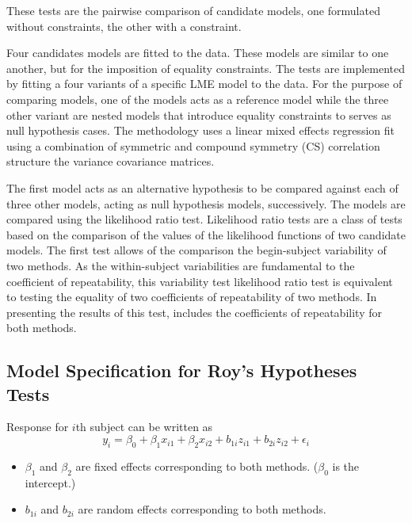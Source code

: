 \documentclass[12pt, a4paper]{report}
\theoremstyle{plain}
\theoremstyle{definition}
\theoremstyle{remark}
\begin{document}
	
	These tests are the pairwise comparison of candidate models, one formulated without constraints, the other with a constraint.
	
	
	Four candidates models are fitted to the data. These models are similar to one another, but for the imposition of equality constraints. The tests are implemented by fitting a four variants of a specific LME model to the data. For the purpose of comparing models, one of the models acts as a reference model while the three other variant are nested models that introduce equality constraints to serves as null hypothesis cases. The methodology uses a linear mixed effects regression fit using a combination of symmetric and 
	compound symmetry (CS) correlation structure the variance covariance matrices.
	
	
	
	
	The first model acts as an alternative hypothesis to be compared against each of three other models, acting as null hypothesis models, successively. The models are compared using the likelihood ratio test. Likelihood ratio tests are a class of tests based on the comparison of the values of the likelihood functions of two candidate models. 
	The first test allows of the comparison the begin-subject variability of two methods. As the within-subject variabilities are fundamental to the coefficient of repeatability, this variability test likelihood ratio test is equivalent to testing the equality of two coefficients of repeatability of two methods. In presenting the results of this test, \citet{ARoy2009} includes the coefficients of repeatability for both methods.
	
	\subsection{Model Specification for Roy's Hypotheses Tests}
	
	Response for $i$th subject can be written as
	\[ y_i = \beta_0 + \beta_1x_{i1} + \beta_2x_{i2} + b_{1i}z_{i1}  + b_{2i}z_{i2} + \epsilon_i \]
	\begin{itemize}
		\item $\beta_1$ and $\beta_2$ are fixed effects corresponding to both methods. ($\beta_0$ is the intercept.)
		\item $b_{1i}$ and $b_{2i}$ are random effects corresponding to both methods.
	\end{itemize}
	
\end{document}
